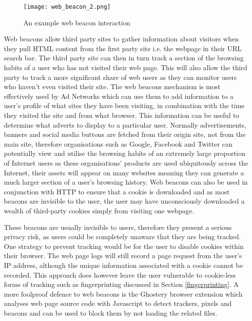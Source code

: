 \documentclass[12pt]{article}
\begin{document}
\begin{figure}[H]
    \centering
    \texttt{[image: web\_beacon\_2.png]}
    \caption{An example web beacon interaction}
    \label{fig:web_beacons}
\end{figure}

Web beacons allow third party sites to gather information about visitors when they pull HTML content from the first party site i.e. the webpage in their URL search bar. The third party site can then in turn track a section of the browsing habits of a user who has not visited their web page. This will also allow the third party to track a more significant share of web users as they can monitor users who haven't even visited their site. The web beacons mechanism is most effectively used by Ad Networks which can use them to add information to a user's profile of what sites they have been visiting, in combination with the time they visited the site and from what browser. This information can be useful to determine what adverts to display to a particular user. Normally advertisements, banners and social media buttons are fetched from their origin site, not from the main site, therefore organisations such as Google, Facebook and Twitter can potentially view and utilise the browsing habits of an extremely large proportion of Internet users as these organisations' products are used ubiquitously across the Internet, their assets will appear on many websites meaning they can generate a much larger section of a user's browsing history. Web beacons can also be used in conjunction with HTTP to ensure that a cookie is downloaded and as most beacons are invisible to the user, the user may have unconsciously downloaded a wealth of third-party cookies simply from visiting one webpage. \newline

These beacons are usually invisible to users, therefore they present a serious privacy risk, as users could be completely unaware that they are being tracked. One strategy to prevent tracking would be for the user to disable cookies within their browser. The web page logs will still record a page request from the user's IP address, although the unique information associated with a cookie cannot be recorded. This approach does however leave the user vulnerable to cookie-less forms of tracking such as fingerprinting discussed in Section \ref{fingerprinting}. A more foolproof defence to web beacons is the Ghostery browser extension which analyses web page source code with Javascript to detect trackers, pixels and beacons and can be used to block them by not loading the related files. 
\end{document}
